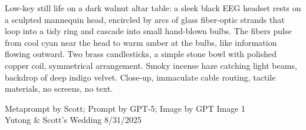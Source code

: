 \documentclass[12pt]{article}
\begin{document}
\noindent
\begin{adjustbox}{max size={\textwidth}{\textheight}}
\begin{varwidth}{\textwidth}
\RaggedRight
\footnotesize
Low-key still life on a dark walnut altar table: a sleek black EEG headset rests on a sculpted mannequin head, encircled by arcs of glass fiber-optic strands that loop into a tidy ring and cascade into small hand-blown bulbs. The fibers pulse from cool cyan near the head to warm amber at the bulbs, like information flowing outward. Two brass candlesticks, a simple stone bowl with polished copper coil, symmetrical arrangement. Smoky incense haze catching light beams, backdrop of deep indigo velvet. Close-up, immaculate cable routing, tactile materials, no screens, no text.
\end{varwidth}
\end{adjustbox}
\vfill
{\raggedleft\footnotesize
Metaprompt by Scott; Prompt by GPT-5; Image by GPT Image 1 \\
Yutong \& Scott's Wedding 8/31/2025\par}
\end{document}

